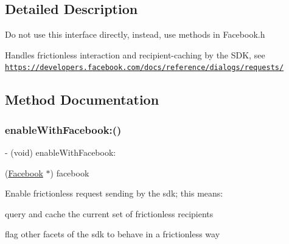 \subsection{Detailed Description}
Do not use this interface directly, instead, use methods in Facebook.\+h

Handles frictionless interaction and recipient-\/caching by the S\+DK, see \href{https://developers.facebook.com/docs/reference/dialogs/requests/}{\tt https\+://developers.\+facebook.\+com/docs/reference/dialogs/requests/} 

\subsection{Method Documentation}
\mbox{\label{interfaceFBFrictionlessRequestSettings_a20d87a686eed0f68e9652ed8174b2c0a}} 
\subsubsection{\texorpdfstring{enable\+With\+Facebook\+:()}{enableWithFacebook:()}\hspace{0.1cm}{\footnotesize\ttfamily [1/2]}}
{\footnotesize\ttfamily -\/ (void) enable\+With\+Facebook\+: \begin{DoxyParamCaption}\item[{(\hyperlink{interfaceFacebook}{Facebook} $\ast$)}]{facebook }\end{DoxyParamCaption}}

Enable frictionless request sending by the sdk; this means\+:
\begin{DoxyEnumerate}
\item query and cache the current set of frictionless recipients
\item flag other facets of the sdk to behave in a frictionless way 
\end{DoxyEnumerate}\mbox{\label{interfaceFBFrictionlessRequestSettings_a20d87a686eed0f68e9652ed8174b2c0a}} 
